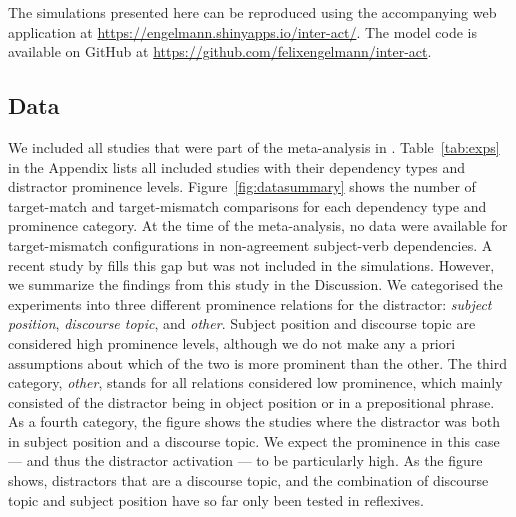 \documentclass{cambridge7A}\usepackage[]{graphicx}\usepackage[]{color}
\begin{document}
The simulations presented here can be reproduced using the accompanying web application at \url{https://engelmann.shinyapps.io/inter-act/}.
The model code is available on GitHub at \url{https://github.com/felixengelmann/inter-act}.

\subsection{Data}
We included all studies that were part of the meta-analysis in \cite{JaegerEngelmannVasishth2017}. Table~\ref{tab:exps} in the Appendix lists all included studies with their dependency types and distractor prominence levels.
Figure~\ref{fig:datasummary} shows the number of target-match and target-mismatch comparisons for each dependency type and prominence category. At the time of the meta-analysis, no data were available for target-mismatch configurations in non-agreement subject-verb dependencies.
A recent study by \cite{CunningsSturt2018} fills this gap but was not included in the simulations. However, we summarize the findings from this study in the Discussion.
We categorised the experiments into three different prominence relations for the distractor: \textit{subject position}, \textit{discourse topic}, and \textit{other}. Subject position and discourse topic are considered high prominence levels, although we do not make any a priori assumptions about which of the two is more prominent than the other. The third category, \textit{other}, stands for all relations considered low prominence, which mainly consisted of the distractor being in object position or in a prepositional phrase. 
As a fourth category, the figure shows the studies where the distractor was both in subject position and a discourse topic. We expect the prominence in this case --- and thus the distractor activation --- to be particularly high.
As the figure shows, distractors that are a discourse topic, and the combination of discourse topic and subject position have so far only been tested in reflexives.
\end{document}
